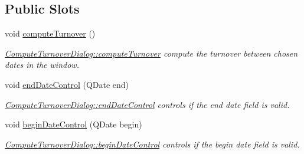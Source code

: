 \subsection*{Public Slots}
\begin{DoxyCompactItemize}
\item 
\hypertarget{classGui_1_1Dialogs_1_1ComputeTurnoverDialog_ab4d2a48bffed8c09e3d16e2849fd4b0e}{void \hyperlink{classGui_1_1Dialogs_1_1ComputeTurnoverDialog_ab4d2a48bffed8c09e3d16e2849fd4b0e}{compute\-Turnover} ()}\label{classGui_1_1Dialogs_1_1ComputeTurnoverDialog_ab4d2a48bffed8c09e3d16e2849fd4b0e}

\begin{DoxyCompactList}\small\item\em \hyperlink{classGui_1_1Dialogs_1_1ComputeTurnoverDialog_ab4d2a48bffed8c09e3d16e2849fd4b0e}{Compute\-Turnover\-Dialog\-::compute\-Turnover} compute the turnover between chosen dates in the window. \end{DoxyCompactList}\item 
void \hyperlink{classGui_1_1Dialogs_1_1ComputeTurnoverDialog_aec195a2ea796179dbf584dd806077164}{end\-Date\-Control} (Q\-Date end)
\begin{DoxyCompactList}\small\item\em \hyperlink{classGui_1_1Dialogs_1_1ComputeTurnoverDialog_aec195a2ea796179dbf584dd806077164}{Compute\-Turnover\-Dialog\-::end\-Date\-Control} controls if the {\itshape end} date field is valid. \end{DoxyCompactList}\item 
void \hyperlink{classGui_1_1Dialogs_1_1ComputeTurnoverDialog_ae7efebd5303635280c02072567298df7}{begin\-Date\-Control} (Q\-Date begin)
\begin{DoxyCompactList}\small\item\em \hyperlink{classGui_1_1Dialogs_1_1ComputeTurnoverDialog_ae7efebd5303635280c02072567298df7}{Compute\-Turnover\-Dialog\-::begin\-Date\-Control} controls if the {\itshape begin} date field is valid. \end{DoxyCompactList}\end{DoxyCompactItemize}
